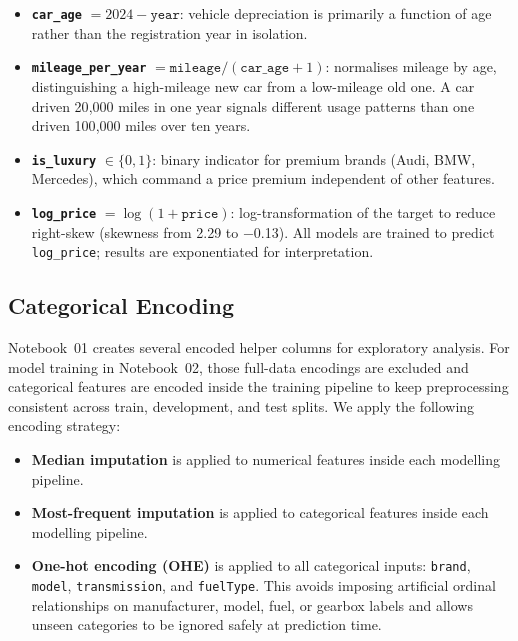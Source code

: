 \begin{itemize}
  \item \textbf{\texttt{car\_age}} $= 2024 - \texttt{year}$: vehicle depreciation is primarily a function of age rather than the registration year in isolation.
  \item \textbf{\texttt{mileage\_per\_year}} $= \texttt{mileage} / (\texttt{car\_age} + 1)$: normalises mileage by age, distinguishing a high-mileage new car from a low-mileage old one. A car driven 20{,}000 miles in one year signals different usage patterns than one driven 100{,}000 miles over ten years.
  \item \textbf{\texttt{is\_luxury}} $\in \{0, 1\}$: binary indicator for premium brands (Audi, BMW, Mercedes), which command a price premium independent of other features.
  \item \textbf{\texttt{log\_price}} $= \log(1 + \texttt{price})$: log-transformation of the target to reduce right-skew (skewness from 2.29 to $-$0.13). All models are trained to predict \texttt{log\_price}; results are exponentiated for interpretation.
\end{itemize}

\subsection{Categorical Encoding}
\label{sec:encoding}

Notebook~01 creates several encoded helper columns for exploratory analysis.
For model training in Notebook~02, those full-data encodings are excluded and categorical features are encoded inside the training pipeline to keep preprocessing consistent across train, development, and test splits.
We apply the following encoding strategy:

\begin{itemize}
  \item \textbf{Median imputation} is applied to numerical features inside each modelling pipeline.
  \item \textbf{Most-frequent imputation} is applied to categorical features inside each modelling pipeline.
  \item \textbf{One-hot encoding (OHE)} is applied to all categorical inputs: \texttt{brand}, \texttt{model}, \texttt{transmission}, and \texttt{fuelType}. This avoids imposing artificial ordinal relationships on manufacturer, model, fuel, or gearbox labels and allows unseen categories to be ignored safely at prediction time.
\end{itemize}

